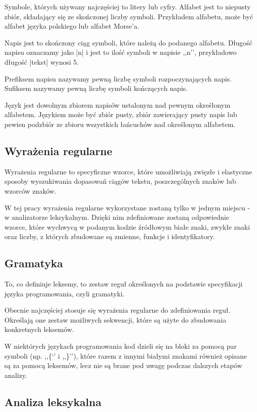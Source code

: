 \documentclass[a4paper,12pt]{article}
\begin{document}
Symbole, których używany najczęściej to litery lub cyfry. Alfabet jest to niepusty zbiór, składający się ze skończonej liczby symboli. Przykładem alfabetu, może być alfabet języka polskiego lub alfabet Morse’a.

Napis jest to skończony ciąg symboli, które należą do podanego alfabetu. Długość napisu oznaczamy jako |n| i jest to ilość symboli w napisie ,,n’’, przykładowo długość |tekst| wynosi 5.

Prefiksem napisu nazywamy pewną liczbę symboli rozpoczynających napis. Sufiksem nazywamy pewną liczbę symboli kończących napis. 

Język jest dowolnym zbiorem napisów ustalonym nad pewnym okreśłonym alfabetem. Językiem może być zbiór pusty, zbiór zawierający pusty napis lub pewien podzbiór ze zbioru wszystkich łańcuchów nad określonym alfabetem.

\subsection{Wyrażenia regularne}

Wyrażenia regularne to specyficzne wzorce, które umożliwiają zwięzłe i elastyczne sposoby wyszukiwania dopasowań ciągów tekstu, poszczególnych znaków lub wzorców znaków.

W tej pracy wyrażenia regularne wykorzystane zostaną tylko w jednym miejscu - w analizatorze leksykalnym. Dzięki nim zdefiniowane zostaną odpowiednie wzorce, które wychwycą w podanym kodzie źródłowym białe znaki, zwykłe znaki oraz liczby, z których zbudowane są zmienne, funkcje i identyfikatory.

\subsection{Gramatyka}

To, co definiuje leksemy, to zestaw reguł określonych na podstawie specyfikacji języka programowania, czyli gramatyki.

Obecnie najczęściej stosuje się wyrażenia regularne do zdefiniowania reguł. Określają one zestaw możliwych sekwencji, które są użyte do zbudowania konkretnych leksemów.

W niektórych językach programowania kod dzieli się na bloki za pomocą par symboli (np. ,,\{‘’ i ,,\}’’), które razem z innymi białymi znakami również opisane są za pomocą leksemów, lecz nie są brane pod uwagę podczas dalszych etapów analizy.

\subsection{Analiza leksykalna}
\end{document}
